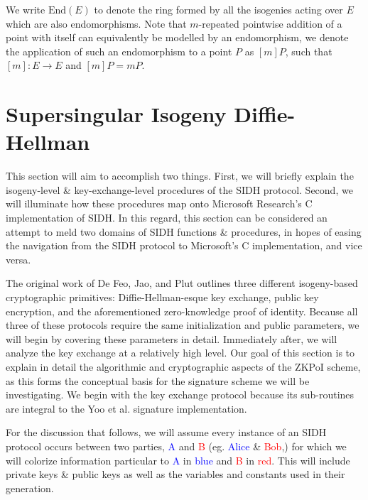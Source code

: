 We write $\text{End}(E)$ to denote the ring formed by all the isogenies acting over $E$ which are also endomorphisms. Note that $m$-repeated pointwise addition of a point with itself can equivalently be modelled by an endomorphism, we denote the application of such an endomorphism to a point $P$ as $[m]P$, such that $[m]: E \rightarrow E$ and $[m]P = mP$.

\section{Supersingular Isogeny Diffie-Hellman}

This section will aim to accomplish two things. First, we will briefly explain the isogeny-level \& key-exchange-level procedures of the SIDH protocol. Second, we will illuminate how these procedures map onto Microsoft Research's C implementation of SIDH. In this regard, this section can be considered an attempt to meld two domains of SIDH functions \& procedures, in hopes of easing the navigation from the SIDH protocol to Microsoft's C implementation, and vice versa.

The original work of De Feo, Jao, and Plut outlines three different isogeny-based cryptographic primitives: Diffie-Hellman-esque key exchange, public key encryption, and the aforementioned zero-knowledge proof of identity. Because all three of these protocols require the same initialization and public parameters, we will begin by covering these parameters in detail. Immediately after, we will analyze the key exchange at a relatively high level. Our goal of this section is to explain in detail the algorithmic and cryptographic aspects of the ZKPoI scheme, as this forms the conceptual basis for the signature scheme we will be investigating. We begin with the key exchange protocol because its sub-routines are integral to the Yoo et al. signature implementation.

For the discussion that follows, we will assume every instance of an SIDH protocol occurs between two parties, \textcolor{blue}{A} and \textcolor{red}{B} (eg. \textcolor{blue}{Alice} \& \textcolor{red}{Bob},) for which we will colorize information particular to \textcolor{blue}{A} in \textcolor{blue}{blue} and \textcolor{red}{B} in \textcolor{red}{red}. This will include private keys \& public keys as well as the variables and constants used in their generation.\\

